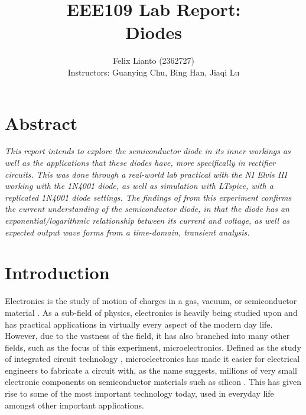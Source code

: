 \documentclass[11pt]{report}
\newenvironment{abstractText}{\timesNewRoman\itshape}{\par}
\begin{document}
	\title{\textbf{EEE109 Lab Report:}\\ Diodes}
	\author{Felix Lianto (2362727)\\
			[1cm]{\small Instructors: Guanying Chu, Bing Han, Jiaqi Lu}}
	\maketitle

\sectionfont{\itshape\fontsize{14pt}{15}\timesNewRoman\selectfont}
\section{Abstract}
\begin{abstractText}
	This report intends to explore the semiconductor diode in its inner workings as well as the applications that these diodes have, more specifically in rectifier circuits. This was done through a real-world lab practical with the NI Elvis III working with the 1N4001 diode, as well as simulation with LTspice, with a replicated 1N4001 diode settings. The findings of from this experiment confirms the current understanding of the semiconductor diode, in that the diode has an exponential/logarithmic relationship between its current and voltage, as well as expected output wave forms from a time-domain, transient analysis.
\end{abstractText}

\rmfamily
\sectionfont{\fontsize{14pt}{15}\rmfamily\selectfont}
\section{Introduction}
Electronics is the study of motion of charges in a gas, vacuum, or semiconductor material \autocite{neamenMicroelectronicsCircuitAnalysis2007}. As a sub-field of physics, electronics is heavily being studied upon and has practical applications in virtually every aspect of the modern day life. However, due to the vastness of the field, it has also branched into many other fields, such as the focus of this experiment, microelectronics. Defined as the study of integrated circuit technology \autocite{neamenMicroelectronicsCircuitAnalysis2007}, microelectronics has made it easier for electrical engineers to fabricate a circuit with, as the name suggests, millions of very small electronic components on semiconductor materials such as silicon \autocite{neamenMicroelectronicsCircuitAnalysis2007}. This has given rise to some of the most important technology today, used in everyday life amongst other important applications.
\end{document}
